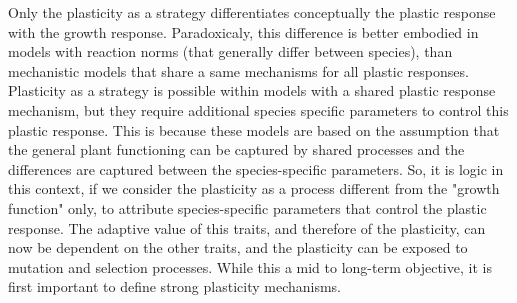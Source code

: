 Only the plasticity as a strategy differentiates conceptually the plastic response with the growth response. Paradoxicaly, this difference is better embodied in models with reaction norms (that generally differ between species), than mechanistic models that share a same mechanisms for all plastic responses. Plasticity as a strategy is possible within models with a shared plastic response mechanism, but they require additional species specific parameters to control this plastic response. This is because these models \parencite{lohier_explaining_2014} are based on the assumption that the general plant functioning can be captured by shared processes and the differences are captured between the species-specific parameters. So, it is logic in this context, if we consider the plasticity as a process different from the "growth function" only, to attribute species-specific parameters that control the plastic response. The adaptive value of this traits, and therefore of the plasticity, can now be dependent on the other traits, and the plasticity can be exposed to mutation and selection processes. While this a mid to long-term objective, it is first important to define strong plasticity mechanisms.

%
%






%

